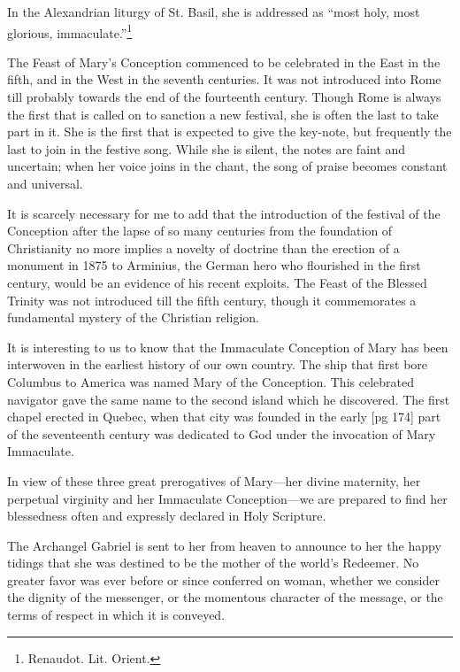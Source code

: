 In the Alexandrian liturgy of St. Basil, she is
addressed as “most holy, most glorious, immaculate.”\footnote{Renaudot.
Lit. Orient.}

The Feast of Mary's Conception commenced to
be celebrated in the East in the fifth, and in the
West in the seventh centuries. It was not introduced
into Rome till probably towards the end
of the fourteenth century. Though Rome is always
the first that is called on to sanction a new
festival, she is often the last to take part in it.
She is the first that is expected to give the key-note,
but frequently the last to join in the festive
song. While she is silent, the notes are faint and
uncertain; when her voice joins in the chant, the
song of praise becomes constant and universal.

It is scarcely necessary for me to add that the
introduction of the festival of the Conception after
the lapse of so many centuries from the foundation
of Christianity no more implies a novelty of
doctrine than the erection of a monument in 1875
to Arminius, the German hero who flourished in
the first century, would be an evidence of his recent
exploits. The Feast of the Blessed Trinity
was not introduced till the fifth century, though
it commemorates a fundamental mystery of the
Christian religion.

It is interesting to us to know that the Immaculate
Conception of Mary has been interwoven in
the earliest history of our own country. The ship
that first bore Columbus to America was named
Mary of the Conception. This celebrated navigator
gave the same name to the second island
which he discovered. The first chapel erected in
Quebec, when that city was founded in the early
[pg 174]
part of the seventeenth century was dedicated to
God under the invocation of Mary Immaculate.

In view of these three great prerogatives of
Mary—her divine maternity, her perpetual virginity
and her Immaculate Conception—we are
prepared to find her blessedness often and expressly
declared in Holy Scripture.

The Archangel Gabriel is sent to her from
heaven to announce to her the happy tidings that
she was destined to be the mother of the world's
Redeemer. No greater favor was ever before or
since conferred on woman, whether we consider the
dignity of the messenger, or the momentous character
of the message, or the terms of respect in
which it is conveyed.

